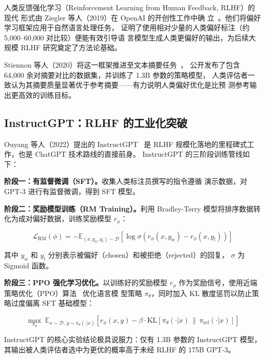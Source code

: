 \documentclass[12pt,a4paper,UTF8]{ctexart}
\newcommand{\E}{\mathbb{E}}
\newcommand{\KL}{\mathrm{KL}}
\newcommand{\sigmoid}{\sigma}
\newcommand{\piref}{\pi_{\mathrm{ref}}}
\newcommand{\pitheta}{\pi_{\theta}}
\begin{document}
人类反馈强化学习（Reinforcement Learning from Human Feedback, RLHF）的现代
形式由 Ziegler 等人（2019）在 OpenAI 的开创性工作中确
立~\cite{ziegler2019finetuning}。他们将偏好学习框架应用于自然语言处理任务，
证明了使用相对少量的人类偏好标注（约 5,000--60,000 对比较）便能有效引导语
言模型生成人类更偏好的输出，为后续大规模 RLHF 研究奠定了方法论基础。

Stiennon 等人（2020）将这一框架推进至文本摘要任务~\cite{stiennon2020learning}，
公开发布了包含 64,000 余对摘要对比的数据集，并训练了 1.3B 参数的策略模型，
人类评估者一致认为其摘要质量显著优于参考摘要——有力说明人类偏好优化是比预
测参考输出更高效的训练目标。

\subsection{InstructGPT：RLHF 的工业化突破}

Ouyang 等人（2022）提出的 InstructGPT~\cite{ouyang2022instructgpt} 是 RLHF
规模化落地的里程碑式工作，也是 ChatGPT 技术路线的直接前身。
InstructGPT 的三阶段训练管线如下：

\noindent\textbf{阶段一：有监督微调（SFT）。}收集人类标注员撰写的指令遵循
演示数据，对 GPT-3 进行有监督微调，得到 SFT 模型。

\noindent\textbf{阶段二：奖励模型训练（RM Training）。}利用 Bradley-Terry
模型将排序数据转化为成对偏好数据，训练奖励模型 $r_\phi$：

\begin{equation}
  \mathcal{L}_{\mathrm{RM}}(\phi)
    = -\E_{(x,y_w,y_l)\sim\mathcal{D}}\!\left[
        \log\sigmoid\!\left(r_\phi(x,y_w) - r_\phi(x,y_l)\right)
      \right]
  \label{eq:rm_loss}
\end{equation}

其中 $y_w$ 和 $y_l$ 分别表示被偏好（chosen）和被拒绝（rejected）的回复，
$\sigmoid$ 为 Sigmoid 函数。

\noindent\textbf{阶段三：PPO 强化学习优化。}以训练好的奖励模型 $r_\phi$
作为奖励信号，使用近端策略优化（PPO）算法~\cite{schulman2017ppo} 优化语言模
型策略 $\pitheta$，同时加入 KL 散度惩罚以防止策略过度偏离 SFT 基础模型：

\begin{equation}
  \max_{\pitheta}\; \E_{x\sim\mathcal{D},\,y\sim\pitheta(\cdot|x)}\!\left[
    r_\phi(x,y) - \beta\cdot\KL\!\left[\pitheta(\cdot|x)\,\big\|\,\piref(\cdot|x)\right]
  \right]
  \label{eq:rlhf_obj}
\end{equation}

InstructGPT 的核心实验结论极具说服力：仅有 1.3B 参数的 InstructGPT 模型，
其输出被人类评估者选中为更优的概率高于未经 RLHF 的 175B GPT-3。
\end{document}
